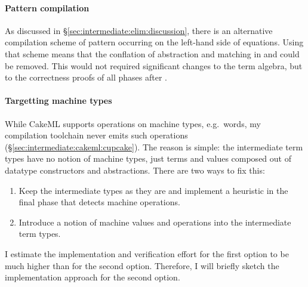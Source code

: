 \paragraph{Pattern compilation}
As discussed in §\ref{sec:intermediate:elim:discussion}, there is an alternative compilation scheme of pattern occurring on the left-hand side of equations.
Using that scheme means that the conflation of abstraction and matching in  and  could be removed.
This would not required significant changes to the term algebra, but to the correctness proofs of all phases after .

\paragraph{Targetting machine types}
While CakeML supports operations on machine types, e.g.\ words, my compilation toolchain never emits such operations (§\ref{sec:intermediate:cakeml:cupcake}).
The reason is simple: the intermediate term types have no notion of machine types, just terms and values composed out of datatype constructors and abstractions.
There are two ways to fix this:

\begin{enumerate}
  \item Keep the intermediate types as they are and implement a heuristic in the final phase that detects machine operations.
  \item Introduce a notion of machine values and operations into the intermediate term types.
\end{enumerate}

\noindent
I estimate the implementation and verification effort for the first option to be much higher than for the second option.
Therefore, I will briefly sketch the implementation approach for the second option.

